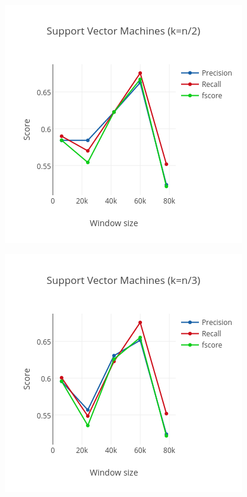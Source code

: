 \documentclass[letterpaper,11pt]{article}
\begin{document}
\begin{figure}
\begin{minipage}{.45\linewidth}
  \label{fig:gbr3}
\end{minipage}
\begin{minipage}{.45\linewidth}
  \includegraphics[width=\linewidth]{../data_mapred/img/truncated/svm2.png}
  \label{fig:svm2}
\end{minipage}
\begin{minipage}{.45\linewidth}
  \includegraphics[width=\linewidth]{../data_mapred/img/truncated/svm3.png}

\end{minipage}
\end{figure}
\end{document}
